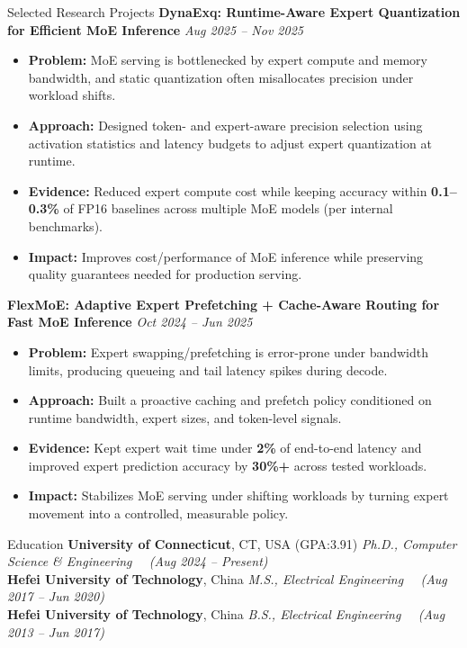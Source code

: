 \documentclass[]{resume}
\newcommand{\sectionvspace}{\vspace{1.5pt}}
\begin{document}
\begin{rSection}{Selected Research Projects}
\textbf{DynaExq: Runtime-Aware Expert Quantization for Efficient MoE Inference} \hfill \textit{Aug 2025 -- Nov 2025}
\begin{itemize}
  \item \textbf{Problem:} MoE serving is bottlenecked by expert compute and memory bandwidth, and static quantization often misallocates precision under workload shifts.
  \item \textbf{Approach:} Designed token- and expert-aware precision selection using activation statistics and latency budgets to adjust expert quantization at runtime.
  \item \textbf{Evidence:} Reduced expert compute cost while keeping accuracy within \textbf{0.1--0.3\%} of FP16 baselines across multiple MoE models (per internal benchmarks).
  \item \textbf{Impact:} Improves cost/performance of MoE inference while preserving quality guarantees needed for production serving.
\end{itemize}

\textbf{FlexMoE: Adaptive Expert Prefetching + Cache-Aware Routing for Fast MoE Inference} \hfill \textit{Oct 2024 -- Jun 2025}
\begin{itemize}
  \item \textbf{Problem:} Expert swapping/prefetching is error-prone under bandwidth limits, producing queueing and tail latency spikes during decode.
  \item \textbf{Approach:} Built a proactive caching and prefetch policy conditioned on runtime bandwidth, expert sizes, and token-level signals.
  \item \textbf{Evidence:} Kept expert wait time under \textbf{2\%} of end-to-end latency and improved expert prediction accuracy by \textbf{30\%+} across tested workloads.
  \item \textbf{Impact:} Stabilizes MoE serving under shifting workloads by turning expert movement into a controlled, measurable policy.
\end{itemize}

\end{rSection}

\begin{rSection}{Education}\sectionvspace
\textbf{University of Connecticut}, CT, USA (GPA:3.91) \hfill \textit{Ph.D., Computer Science \& Engineering \ \ (Aug 2024 -- Present)}\\
\textbf{Hefei University of Technology}, China \hfill \textit{M.S., Electrical Engineering \ \ (Aug 2017 -- Jun 2020)}\\
\textbf{Hefei University of Technology}, China \hfill \textit{B.S., Electrical Engineering \ \ (Aug 2013 -- Jun 2017)}
\end{rSection}
\end{document}
